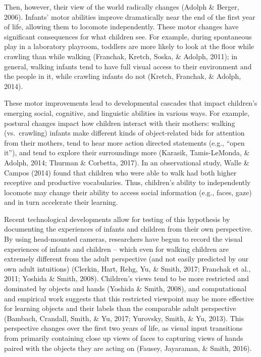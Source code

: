 \documentclass[10pt, letterpaper]{article}
\begin{document}
Then, however, their view of the world radically changes (Adolph \&
Berger, 2006). Infants' motor abilities improve dramatically near the
end of the first year of life, allowing them to locomote independently.
These motor changes have significant consequences for what children see.
For example, during spontaneous play in a laboratory playroom, toddlers
are more likely to look at the floor while crawling than while walking
(Franchak, Kretch, Soska, \& Adolph, 2011); in general, walking infants
tend to have full visual access to their environment and the people in
it, while crawling infants do not (Kretch, Franchak, \& Adolph, 2014).

These motor improvements lead to developmental cascades that impact
children's emerging social, cognitive, and linguistic abilities in
various ways. For example, postural changes impact how children interact
with their mothers: walking (vs.~crawling) infants make different kinds
of object-related bids for attention from their mothers, tend to hear
more action directed statements (e.g., ``open it''), and tend to explore
their surroundings more (Karasik, Tamis-LeMonda, \& Adolph, 2014;
Thurman \& Corbetta, 2017). In an observational study, Walle \& Campos
(2014) found that children who were able to walk had both higher
receptive and productive vocabularies. Thus, children's ability to
independently locomote may change their ability to access social
information (e.g., faces, gaze) and in turn accelerate their learning.

Recent technological developments allow for testing of this hypothesis
by documenting the experiences of infants and children from their own
perspective. By using head-mounted cameras, researchers have begun to
record the visual experiences of infants and children -- which even for
walking children are extremely different from the adult perspective (and
not easily predicted by our own adult intuitions) (Clerkin, Hart, Rehg,
Yu, \& Smith, 2017; Franchak et al., 2011; Yoshida \& Smith, 2008).
Children's views tend to be more restricted and dominated by objects and
hands (Yoshida \& Smith, 2008), and computational and empirical work
suggests that this restricted viewpoint may be more effective for
learning objects and their labels than the comparable adult perspective
(Bambach, Crandall, Smith, \& Yu, 2017; Yurovsky, Smith, \& Yu, 2013).
This perspective changes over the first two years of life, as visual
input transitions from primarily containing close up views of faces to
capturing views of hands paired with the objects they are acting on
(Fausey, Jayaraman, \& Smith, 2016).
\end{document}

